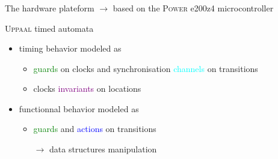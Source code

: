 \documentclass[usenames,dvipsnames]{beamer}
\begin{document}
  \begin{frame}
    \frametitle{\secname}
    \small

    \begin{block}{The hardware plateform}
      $\rightarrow$ based on the \textsc{Power} e200z4 microcontroller
    \end{block}

    \begin{block}{\textsc{Uppaal} timed automata}
      \begin{itemize}
        \item timing behavior modeled as
        \begin{itemize}
          \item \textcolor{Green}{guards} on clocks and synchronisation \textcolor{cyan}{channels} on transitions
          \item clocks \textcolor{purple}{invariants} on locations
        \end{itemize}
        \item functionnal behavior modeled as
        \begin{itemize}
          \item \textcolor{Green}{guards} and \textcolor{blue}{actions} on transitions
          \item[$\rightarrow$] data structures manipulation 
        \end{itemize}
      \end{itemize}
    \end{block}
  \end{frame}
\end{document}

